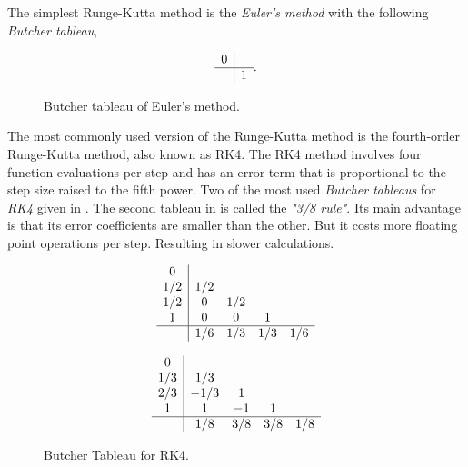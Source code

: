 \documentclass[a4paper,oneside,12pt]{report}
\numberwithin{equation}{chapter}
\begin{document}
The simplest Runge-Kutta method is the \textit{Euler's method} with the following \textit{Butcher tableau},

\begin{figure}[h!]
\[ 
    \begin{array} 
        {c|cccc}
        0\\
        \hline
        & 1
    \end{array} .
\] 
\caption{Butcher tableau of Euler's method.}
\label{fig:Butcher_euler}
\end{figure}

The most commonly used version of the Runge-Kutta method is the fourth-order Runge-Kutta method, also known as RK4. 
The RK4 method involves four function evaluations per step and has an error term that is proportional to the step size raised to the fifth power.
Two of the most used \textit{Butcher tableaus} for \textit{RK4} given in .
The second tableau in  is called the \textit{"3/8 rule"}. Its main advantage is that its error coefficients are smaller than the other. But it costs more floating point operations per step. 
Resulting in slower calculations. 

\begin{figure}[h!]
    \centering
    \begin{minipage}{.5\textwidth}
        \[ 
        \begin{array} 
            {c|cccc}
            0\\
            1/2 & 1/2 \\
            1/2 & 0 & 1/2 \\
            1   & 0 & 0 & 1\\
            \hline
            & 1/6 & 1/3 & 1/3 & 1/6
        \end{array}
        \]  
    \end{minipage}%
    \begin{minipage}{.5\textwidth}
        \[ 
        \begin{array} 
            {c|cccc}
            0\\
            1/3 & 1/3 \\
            2/3 & -1/3 & 1 \\
            1   & 1 & -1 & 1\\
            \hline
            & 1/8 & 3/8 & 3/8 & 1/8
        \end{array}
        \]  
    \end{minipage}
    \vspace{20pt}
    \caption{Butcher Tableau for RK4.}
    \label{fig:Butcher-RK4}
\end{figure}
\end{document}
